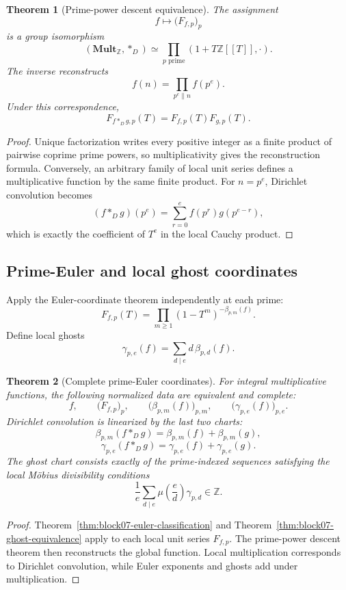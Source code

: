 \documentclass[11pt]{article}
\newtheorem{theorem}{Theorem}[section]
\theoremstyle{definition}
\theoremstyle{remark}
\begin{document}
\begin{theorem}[Prime-power descent equivalence]
\label{thm:block07-prime-power-descent}
The assignment
\[
f\longmapsto\bigl(F_{f,p}\bigr)_p
\]
is a group isomorphism
\[
\boxed{
(\mathbf{Mult}_{\mathbb Z},\mathbin{\ast_D})
\simeq
\prod_{p\text{ prime}}
(1+T\mathbb Z[[T]],\cdot).
}
\]
The inverse reconstructs
\[
\boxed{
f(n)=\prod_{p^e\parallel n}f(p^e).}
\]
Under this correspondence,
\[
F_{f\ast_D g,p}(T)
=
F_{f,p}(T)F_{g,p}(T).
\]
\end{theorem}

\begin{proof}
Unique factorization writes every positive integer as a finite product of pairwise coprime prime powers, so multiplicativity gives the reconstruction formula.  Conversely, an arbitrary family of local unit series defines a multiplicative function by the same finite product.  For $n=p^e$, Dirichlet convolution becomes
\[
(f\mathbin{\ast_D}g)(p^e)
=
\sum_{r=0}^{e}f(p^r)g(p^{e-r}),
\]
which is exactly the coefficient of $T^e$ in the local Cauchy product.
\end{proof}

\subsection{Prime-Euler and local ghost coordinates}

Apply the Euler-coordinate theorem independently at each prime:
\[
F_{f,p}(T)
=
\prod_{m\geq1}(1-T^m)^{-\beta_{p,m}(f)}.
\]
Define local ghosts
\[
\gamma_{p,e}(f)
=
\sum_{d\mid e}d\,\beta_{p,d}(f).
\]

\begin{theorem}[Complete prime-Euler coordinates]
\label{thm:block07-prime-euler}
For integral multiplicative functions, the following normalized data are equivalent and complete:
\[
 f,
\qquad
\bigl(F_{f,p}\bigr)_p,
\qquad
\bigl(\beta_{p,m}(f)\bigr)_{p,m},
\qquad
\bigl(\gamma_{p,e}(f)\bigr)_{p,e}.
\]
Dirichlet convolution is linearized by the last two charts:
\[
\beta_{p,m}(f\mathbin{\ast_D}g)
=
\beta_{p,m}(f)+\beta_{p,m}(g),
\]
\[
\gamma_{p,e}(f\mathbin{\ast_D}g)
=
\gamma_{p,e}(f)+\gamma_{p,e}(g).
\]
The ghost chart consists exactly of the prime-indexed sequences satisfying the local M\"obius divisibility conditions
\[
\frac1e\sum_{d\mid e}\mu\!\left(\frac ed\right)\gamma_{p,d}\in\mathbb Z.
\]
\end{theorem}

\begin{proof}
Theorem~\ref{thm:block07-euler-classification} and Theorem~\ref{thm:block07-ghost-equivalence} apply to each local unit series $F_{f,p}$.  The prime-power descent theorem then reconstructs the global function.  Local multiplication corresponds to Dirichlet convolution, while Euler exponents and ghosts add under multiplication.
\end{proof}
\end{document}
